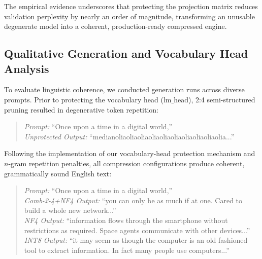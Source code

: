 \documentclass[conference]{IEEEtran}
\begin{document}
The empirical evidence underscores that protecting the projection matrix reduces validation perplexity by nearly an order of magnitude, transforming an unusable degenerate model into a coherent, production-ready compressed engine.

\subsection{Qualitative Generation and Vocabulary Head Analysis}
To evaluate linguistic coherence, we conducted generation runs across diverse prompts. Prior to protecting the vocabulary head ($\text{lm\_head}$), 2:4 semi-structured pruning resulted in degenerative token repetition:
\begin{quote}
\textit{Prompt:} ``Once upon a time in a digital world,'' \\
\textit{Unprotected Output:} ``medianoliaoliaoliaoliaoliaoliaoliaoliaoliaolia...''
\end{quote}
Following the implementation of our vocabulary-head protection mechanism and $n$-gram repetition penalties, all compression configurations produce coherent, grammatically sound English text:
\begin{quote}
\textit{Prompt:} ``Once upon a time in a digital world,'' \\
\textit{Comb-2-4+NF4 Output:} ``you can only be as much if at one. Cared to build a whole new network...'' \\
\textit{NF4 Output:} ``information flows through the smartphone without restrictions as required. Space agents communicate with other devices...'' \\
\textit{INT8 Output:} ``it may seem as though the computer is an old fashioned tool to extract information. In fact many people use computers...''
\end{quote}
\end{document}
